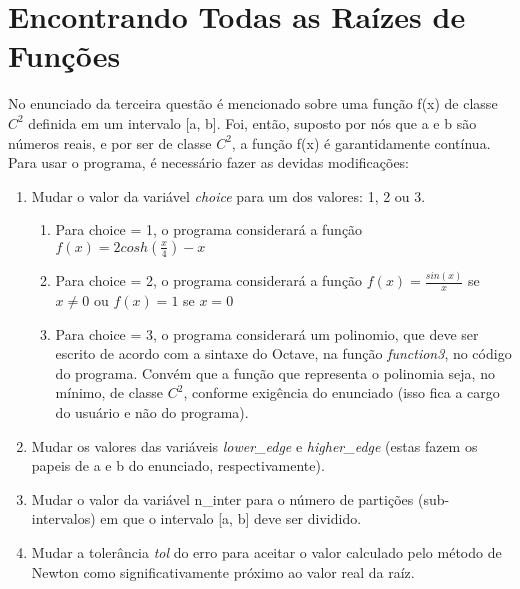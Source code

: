 
\chapter{Encontrando Todas as Raízes de Funções}\label{partes:allRootsFunction}

  No enunciado da terceira questão é mencionado sobre uma função f(x) de classe $C^2$ definida em um intervalo [a, b]. Foi, então, suposto por nós que a e b são números reais, e por ser de classe $C^2$, a função f(x) é garantidamente contínua.\\

  Para usar o programa, é necessário fazer as devidas modificações:\\
  \begin{enumerate}
    \item Mudar o valor da variável \textit{choice} para um dos valores: 1, 2 ou 3.
    \begin{enumerate}
      \item Para choice = 1, o programa considerará a função $f(x) = 2cosh(\frac{x}{4}) - x$
      \item Para choice = 2, o programa considerará a função $f(x) = \frac{sin(x)}{x}$ se $x \neq 0$ ou $f(x) = 1$ se $x = 0$
      \item Para choice = 3, o programa considerará um polinomio, que deve ser escrito de acordo com a sintaxe do Octave, na função \textit{function3}, no código do programa. Convém que a função que representa o polinomia seja, no mínimo, de classe $C^2$, conforme exigência do enunciado (isso fica a cargo do usuário e não do programa).
    \end{enumerate}
    \item Mudar os valores das variáveis \textit{lower\_edge} e \textit{higher\_edge} (estas fazem os papeis de a e b do enunciado, respectivamente).
    \item Mudar o valor da variável n\_inter para o número de partições (sub-intervalos) em que o intervalo [a, b] deve ser dividido.
    \item Mudar a tolerância \textit{tol} do erro para aceitar o valor calculado pelo método de Newton como significativamente próximo ao valor real da raíz.
  \end{enumerate}

